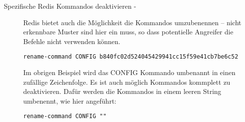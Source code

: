 \begin{description}
\item[Spezifische Redis Kommandos deaktivieren - \newline]
Redis bietet auch die Möglichkeit die Kommandos umzubenennen – nicht erkennbare Muster sind hier ein muss, so dass potentielle Angreifer die Befehle nicht verwenden können.

\lstinline{rename-command CONFIG b840fc02d524045429941cc15f59e41cb7be6c52}

Im obrigen Beispiel wird das CONFIG Kommando umbenannt in einen zufällige Zeichenfolge. Es ist auch möglich Kommandos kommplett zu deaktivieren. Dafür werden die Kommandos in einem leeren String umbenennt, wie hier angeführt:

\lstinline{rename-command CONFIG ""}
\end{description}